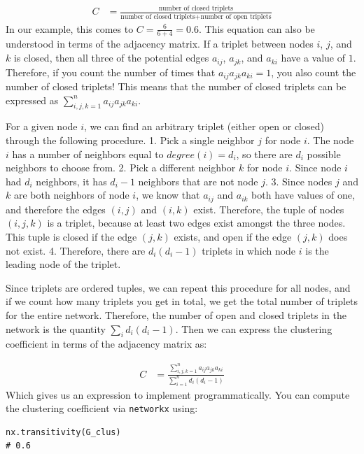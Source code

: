 \begin{align*}
    C &= \frac{\text{number of closed triplets}}{\text{number of closed triplets} + \text{number of open triplets}}
\end{align*}
In our example, this comes to $C = \frac{6}{6 + 4} = 0.6$. This equation can also be understood in terms of the adjacency matrix. If a triplet between nodes $i$, $j$, and $k$ is closed, then all three of the potential edges $a_{ij}$, $a_{jk}$, and $a_{ki}$ have a value of $1$. Therefore, if you count the number of times that $a_{ij}a_{jk}a_{ki} = 1$, you also count the number of closed triplets! This means that the number of closed triplets can be expressed as $\sum_{i,j,k = 1}^na_{ij}a_{jk}a_{ki}$. 

For a given node $i$, we can find an arbitrary triplet (either open or closed) through the following procedure.
1. Pick a single neighbor $j$ for node $i$. The node $i$ has a number of neighbors equal to $degree(i) = d_i$, so there are $d_i$ possible neighbors to choose from.
2. Pick a different neighbor $k$ for node $i$. Since node $i$ had $d_i$ neighbors, it has $d_i - 1$ neighbors that are not node $j$.
3. Since nodes $j$ and $k$ are both neighbors of node $i$, we know that $a_{ij}$ and $a_{ik}$ both have values of one, and therefore the edges $(i, j)$ and $(i, k)$ exist. Therefore, the tuple of nodes $(i, j, k)$ is a triplet, because {at least} two edges exist amongst the three nodes. This tuple is closed if the edge $(j, k)$ exists, and open if the edge $(j, k)$ does not exist.
4. Therefore, there are $d_i (d_i - 1)$ triplets in which node $i$ is the leading node of the triplet.

Since triplets are {ordered tuples}, we can repeat this procedure for all nodes, and if we count how many triplets you get in total, we get the {total number of triplets} for the entire network. Therefore, the number of open and closed triplets in the network is the quantity $\sum_i d_i (d_i - 1)$.  Then we can express the clustering coefficient in terms of the adjacency matrix as:

\begin{align*}
    C &= \frac{\sum_{i,j,k = 1}^n a_{ij}a_{jk}a_{ki}}{\sum_{i = 1}^n d_i (d_i - 1)}
\end{align*}
Which gives us an expression to implement programmatically. You can compute the clustering coefficient via \texttt{networkx} using:

\begin{lstlisting}[style=python]
nx.transitivity(G_clus)
# 0.6
\end{lstlisting}


